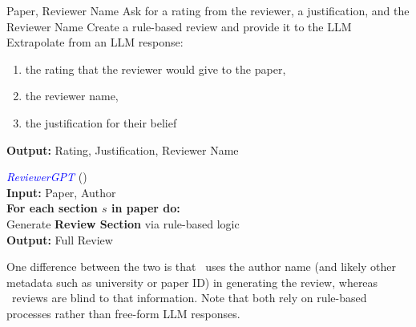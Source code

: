 \documentclass{article} %
\begin{document}
\vspace{1.5em}

\begin{minipage}[t]{0.52\textwidth}
\begin{algorithmic}[1]
     Paper, Reviewer Name
    \STATE Ask for a rating from the reviewer, a justification, and the Reviewer Name
    \STATE Create a rule-based review and provide it to the LLM
    \STATE Extrapolate from an LLM response:
    \begin{enumerate}
        \item the rating that the reviewer would give to the paper,
        \item the reviewer name,
        \item the justification for their belief
    \end{enumerate}
    \STATE \textbf{Output:} Rating, Justification, Reviewer Name
\end{algorithmic}
\end{minipage}
\hfill
\begin{minipage}[t]{0.45\textwidth}
\textcolor{blue}{\textit{ReviewerGPT}} (\textit{\reviewergpt}) \\[0.5em]
\textcolor{myyellow}{\textbf{Input:}} Paper, Author \\[0.3em]
\textbf{For each section $s$ in paper do:} \\
\quad Generate \textcolor{myyellow}{\textbf{Review Section}} via rule-based logic \\[0.3em]
\textcolor{myyellow}{\textbf{Output:}} Full Review
\end{minipage}

\vspace{1em}

One difference between the two is that \reviewergpt\ uses the author name (and likely other metadata such as university or paper ID) in generating the review, whereas \singlellm\ reviews are blind to that information. Note that both rely on rule-based processes rather than free-form LLM responses.
\end{document}
